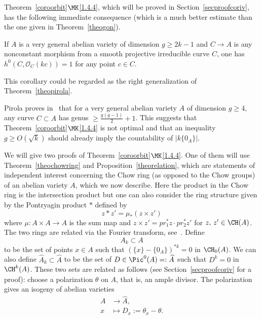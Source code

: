 Theorem~\ref{coroorbit}$\MK$\eqref{1.4.4}, which will be proved in Section~\ref{secproofcoriv}, has the following immediate consequence (which is a much better estimate than the one given in Theorem~\ref{theogon}).

\begin{coro}
If $A$ is a very general abelian variety of dimension $g\geq 2k-1$ and $C\rightarrow A$ is any nonconstant morphism from a smooth projective irreducible curve ${C}$, one has $h^{0}({C},\mathcal{O}_{{C}}(kc))=1$ for any point $c\in {C}$.
\end{coro}

This corollary could be regarded as the right generalization of Theorem~\ref{theopirola}.

\begin{rema}
Pirola proves in~\cite{pirola2} that for a very general abelian variety $A$ of dimension $g\geq4$, any curve $C\subset A$ has genus $\geq \frac{g(g-1)}{2}+1$. This suggests that Theorem~\ref{coroorbit}$\MK$\eqref{1.4.4} is not optimal and that an inequality $g\geq O(\sqrt{k})$ should already imply the countability of $|k\{0_A\}|$.
\end{rema}

We will give two proofs of Theorem~\ref{coroorbit}$\MK$\eqref{1.4.4}. One of them will use Theorem~\ref{theochowring} and Proposition~\ref{theorelation}, which are statements of independent interest concerning the Chow ring (as opposed to the Chow groups) of an abelian variety $A$, which we now describe. Here the product in the Chow ring is the intersection product but one can also consider the ring structure given by the Pontryagin product $*$ defined by
\[
z*z'=\mu_*(z\times z')
\]
where $\mu:A\times A\rightarrow A$ is the sum map and $z\times z'=pr_1^*z\cdot pr_2^*z'$ for $z,\,z'\in \CH(A)$. The two rings are related via the Fourier transform, see~\cite{beauvillefourier}. Define
\begin{equation}\label{eqAk}
A_k\subset A
\end{equation}
to be the set of points $x\in A$ such that $(\{x\}-\{0_A\})^{*k}=0$ in $\CH_0(A)$. We can also define $\widehat{A}_k\subset \widehat{A}$ to be the set of $D\in \Pic^0(A)=:\widehat{A}$ such that $D^k=0$ in $\CH^k(A)$. These two sets are related as follows (see Section~\ref{secproofcoriv} for a proof): choose a polarization $\theta$ on $A$, that is, an ample divisor. The polarization gives an isogeny of abelian varieties
\begin{align*}
A&\rightarrow \widehat{A},\\
x&\mapsto D_x:=\theta_x-\theta.
\end{align*}

